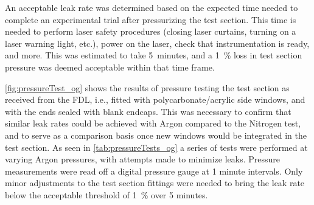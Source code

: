             An acceptable leak rate was determined based on the expected time needed to complete an experimental trial after pressurizing the test section. This time is needed to perform laser safety procedures (closing laser curtains, turning on a laser warning light, etc.), power on the laser, check that instrumentation is ready, and more. This was estimated to take 5~minutes, and a 1~\% loss in test section pressure was deemed acceptable within that time frame.

            \autoref{fig:pressureTest_og} shows the results of pressure testing the test section as received from the FDL, i.e., fitted with polycarbonate/acrylic side windows, and with the ends sealed with blank endcaps. This was necessary to confirm that similar leak rates could be achieved with Argon compared to the Nitrogen test, and to serve as a comparison basis once new windows would be integrated in the test section. As seen in \autoref{tab:pressureTests_og} a series of tests were performed at varying Argon pressures, with attempts made to minimize leaks. Pressure measurements were read off a digital pressure gauge at 1 minute intervals. Only minor adjustments to the test section fittings were needed to bring the leak rate below the acceptable threshold of 1~\% over 5 minutes. 

